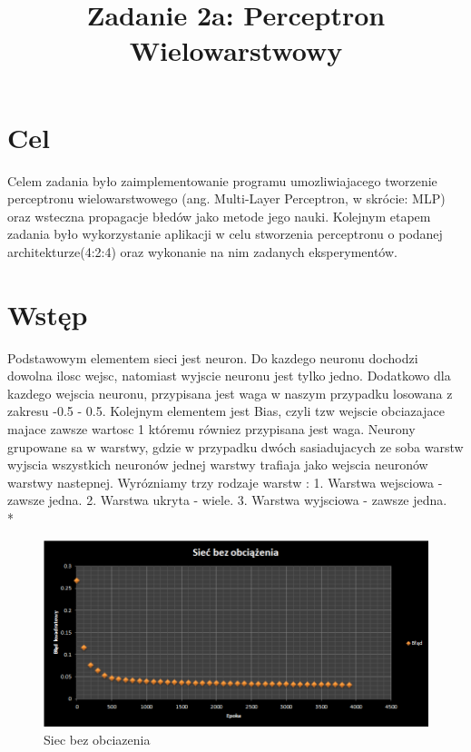 \documentclass{classrep}
\author{
  \studentinfo{Łukasz Ochmański}{183566} \and
  \studentinfo{Przemysław Szwajkowski}{173524}
}
\title{Zadanie 2a: Perceptron Wielowarstwowy}
\begin{document}
\maketitle


\section{Cel}
Celem zadania było zaimplementowanie programu umozliwiajacego tworzenie
perceptronu wielowarstwowego (ang. Multi-Layer Perceptron, w skrócie:
MLP) oraz wsteczna propagacje błedów jako metode jego nauki. Kolejnym
etapem zadania było wykorzystanie aplikacji w celu stworzenia perceptronu
o podanej architekturze(4:2:4) oraz wykonanie na nim zadanych
eksperymentów.

\section{Wstęp}
Podstawowym elementem sieci jest neuron. Do kazdego neuronu dochodzi
dowolna ilosc wejsc, natomiast wyjscie neuronu jest tylko jedno. Dodatkowo
dla kazdego wejscia neuronu, przypisana jest waga w naszym przypadku losowana
z zakresu -0.5 - 0.5. Kolejnym elementem jest Bias, czyli tzw wejscie
obciazajace majace zawsze wartosc 1 któremu równiez przypisana jest waga.
Neurony grupowane sa w warstwy, gdzie w przypadku dwóch sasiadujacych
ze soba warstw wyjscia wszystkich neuronów jednej warstwy trafiaja jako
wejscia neuronów warstwy nastepnej. Wyrózniamy trzy rodzaje warstw :
1. Warstwa wejsciowa - zawsze jedna.
2. Warstwa ukryta - wiele.
3. Warstwa wyjsciowa - zawsze jedna.
\\*

\begin{figure}[ht]
\centering
			\includegraphics[scale=0.65]{pictures/test01.png}
	\caption{Siec bez obciazenia}
	\label{fig:Siec bez obciazenia}
\end{figure}
\end{document}
